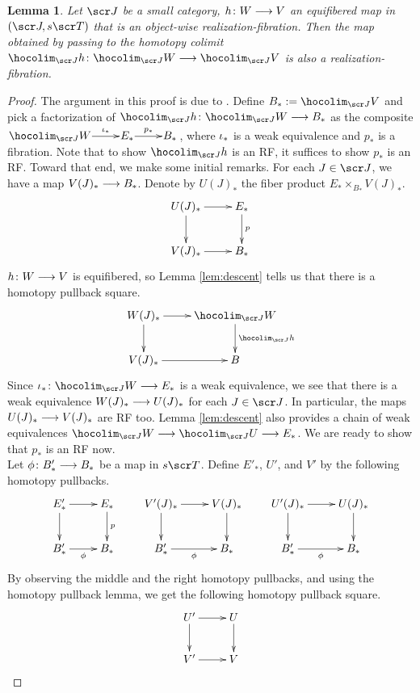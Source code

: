 \documentclass{amsart}
\newtheorem{lem}[thm]{Lemma}
\theoremstyle{definition}
\begin{document}
\begin{lem}\label{lem:localtoglobal}
Let $\sJ$ be a small category, $h \colon W \longrightarrow V$ an equifibered map in $(\sJ, s\sT)$ that is an object-wise realization-fibration. Then the map obtained by passing to the homotopy colimit $\hocolim_{\sJ} h \colon \hocolim_{\sJ} W \rtarr \hocolim_{\sJ} V$ is also a realization-fibration.
\end{lem}
\begin{proof}
The argument in this proof is due to \cite{Rezk14}. Define $B_* := \hocolim_{\sJ} V$ and pick a factorization of $\hocolim_{\sJ} h \colon \hocolim_{\sJ} W \rtarr B_*$ as the composite $\xymatrix@1{\hocolim_{\sJ} W \ar^-{\io_*}[r] & E_* \ar[r]^{p_*} & B_*}$, where $\iota_*$ is a weak equivalence and $p_*$ is a fibration.
Note that to show $\hocolim_{\sJ} h$ is an RF, it suffices to show $p_*$ is an RF. Toward that end, we make some initial remarks.
For each $J \in \sJ$, we have a map $V(J)_* \longrightarrow B_*$. Denote by $U(J)_*$ the fiber product $E_* \times_{B_*} V(J)_*$.
\[
\xymatrix{
    U(J)_* \ar[r] \ar[d] & E_* \ar[d]^-p\\
    V(J)_* \ar[r] & B_*
}
\] 
\noindent 
$h \colon W \longrightarrow V$ is equifibered, so Lemma \ref{lem:descent} tells us that there is a homotopy pullback square.
\[
\xymatrix{
    W(J)_* \ar[r] \ar[d] & \hocolim_{\sJ} W \ar[d]^-{\hocolim_{\sJ}h}\\
    V(J)_* \ar[r] & B
}
\] 
Since $\io_* \colon \hocolim_{\sJ} W \rtarr E_*$ is a weak equivalence, we see that there is a weak equivalence $W(J)_* \longrightarrow U(J)_*$ for each $J \in \sJ$. In particular, the maps $U(J)_* \longrightarrow V(J)_*$ are RF too.
Lemma \ref{lem:descent} also provides a chain of weak equivalences $\hocolim_{\sJ} W \rtarr \hocolim_{\sJ} U \rtarr E_*$. We are ready to show that $p_*$ is an RF now.\\

Let $\phi \colon B'_* \longrightarrow B_*$ be a map in $s\sT$. Define $E'_*$, $U'$, and $V'$ by the following homotopy pullbacks.
\[\xymatrix{
    E'_* \ar[r] \ar[d] & E_* \ar[d]^{p}\\
    B'_* \ar[r]_{\ph} & B_*
} \qquad
\xymatrix{
    V'(J)_* \ar[r] \ar[d] & V(J)_* \ar[d]\\
    B'_* \ar[r]_{\ph} & B_*
} \qquad
\xymatrix{
    U'(J)_* \ar[r] \ar[d] & U(J)_* \ar[d]\\
    B'_* \ar[r]_{\ph} & B_*
}
\]
\noindent By observing the middle and the right homotopy pullbacks, and using the homotopy pullback lemma, we get the following homotopy pullback square. 
\[
\xymatrix{
    U' \ar[r] \ar[d] & U \ar[d]\\
    V' \ar[r] & V
}
\]


\end{proof}
\end{document}
